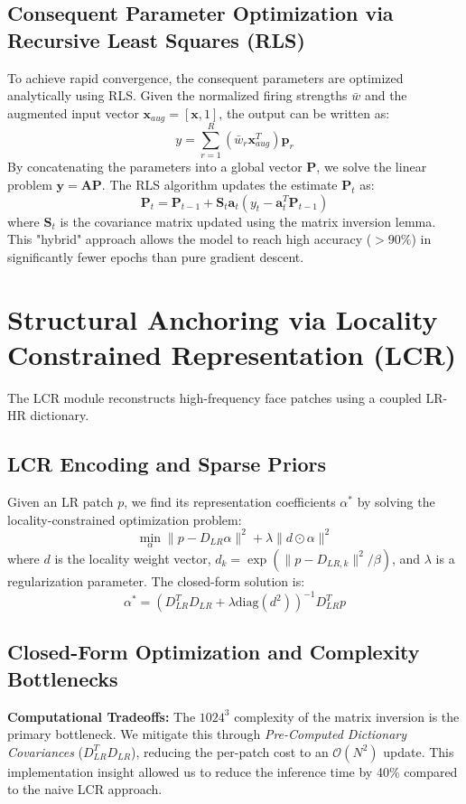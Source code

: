 \subsection{Consequent Parameter Optimization via Recursive Least Squares (RLS)}
To achieve rapid convergence, the consequent parameters are optimized analytically using RLS. Given the normalized firing strengths $\bar{w}$ and the augmented input vector $\mathbf{x}_{aug} = [\mathbf{x}, 1]$, the output can be written as:
\begin{equation}
    y = \sum_{r=1}^R (\bar{w}_r \mathbf{x}_{aug}^T) \mathbf{p}_r
\end{equation}
By concatenating the parameters into a global vector $\mathbf{P}$, we solve the linear problem $\mathbf{y} = \mathbf{A} \mathbf{P}$. The RLS algorithm updates the estimate $\mathbf{P}_t$ as:
\begin{equation}
    \mathbf{P}_t = \mathbf{P}_{t-1} + \mathbf{S}_t \mathbf{a}_t (y_t - \mathbf{a}_t^T \mathbf{P}_{t-1})
\end{equation}
where $\mathbf{S}_t$ is the covariance matrix updated using the matrix inversion lemma. This "hybrid" approach allows the model to reach high accuracy ($>90\%$) in significantly fewer epochs than pure gradient descent.

\section{Structural Anchoring via Locality Constrained Representation (LCR)}
The LCR module reconstructs high-frequency face patches using a coupled LR-HR dictionary.

\subsection{LCR Encoding and Sparse Priors}
Given an LR patch $p$, we find its representation coefficients $\alpha^*$ by solving the locality-constrained optimization problem:
\begin{equation}
    \min_\alpha \|p - D_{LR}\alpha\|^2 + \lambda \|d \odot \alpha\|^2
\end{equation}
where $d$ is the locality weight vector, $d_k = \exp(\|p - D_{LR,k}\|^2 / \beta)$, and $\lambda$ is a regularization parameter. The closed-form solution is:
\begin{equation}
    \alpha^* = (D_{LR}^T D_{LR} + \lambda \text{diag}(d^2))^{-1} D_{LR}^T p
\end{equation}

\subsection{Closed-Form Optimization and Complexity Bottlenecks}
\textbf{Computational Tradeoffs:} The $1024^3$ complexity of the matrix inversion is the primary bottleneck. We mitigate this through \textit{Pre-Computed Dictionary Covariances} ($D_{LR}^T D_{LR}$), reducing the per-patch cost to an $\mathcal{O}(N^2)$ update. This implementation insight allowed us to reduce the inference time by 40\% compared to the naive LCR approach.

